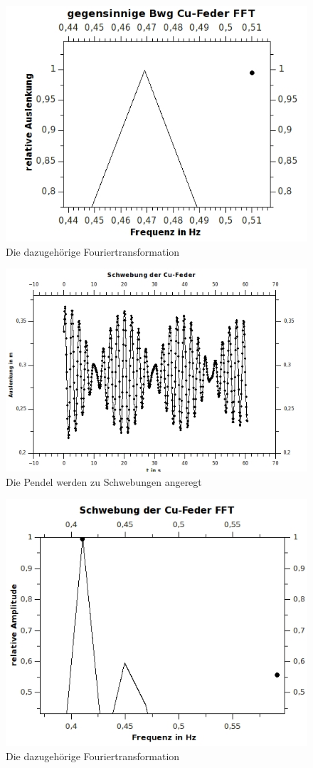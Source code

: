 \begin{figure}[h!]
\centering
\includegraphics[width=0.7\linewidth]{../Messungen/graphen/gg-Bwg-Cu-FFT}
\caption{Die dazugehörige Fouriertransformation}
\label{fig:gg-Bwg-Cu-FFT}
\end{figure}

\clearpage
\begin{figure}[h!]
\centering
\includegraphics[width=0.7\linewidth]{../Messungen/graphen/schwebung-Bwg-Cu}
\caption{Die Pendel werden zu Schwebungen angeregt}
\label{fig:schwebung-Bwg-Cu}
\end{figure}

\begin{figure}[h!]
\centering
\includegraphics[width=0.7\linewidth]{../Messungen/graphen/schwebung-Bwg-Cu-FFT}
\caption{Die dazugehörige Fouriertransformation}
\label{fig:schwebung-Bwg-Cu-FFT}
\end{figure}


